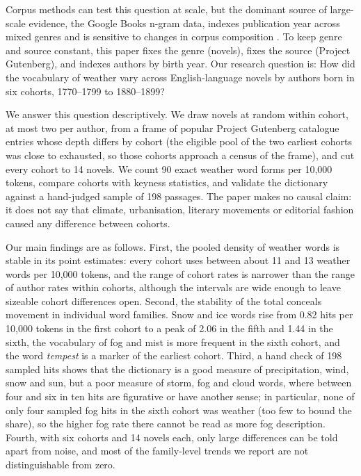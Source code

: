 \documentclass[11pt]{article}
\begin{document}
Corpus methods can test this question at scale, but the dominant source of large-scale evidence, the Google Books n-gram data, indexes publication year across mixed genres and is sensitive to changes in corpus composition \citep{michel2010quantitative, koplenig2015why, koplenig2015the}. To keep genre and source constant, this paper fixes the genre (novels), fixes the source (Project Gutenberg), and indexes authors by birth year. Our research question is: How did the vocabulary of weather vary across English-language novels by authors born in six cohorts, 1770--1799 to 1880--1899?

We answer this question descriptively. We draw novels at random within cohort, at most two per author, from a frame of popular Project Gutenberg catalogue entries whose depth differs by cohort (the eligible pool of the two earliest cohorts was close to exhausted, so those cohorts approach a census of the frame), and cut every cohort to 14 novels. We count 90 exact weather word forms per 10,000 tokens, compare cohorts with keyness statistics, and validate the dictionary against a hand-judged sample of 198 passages. The paper makes no causal claim: it does not say that climate, urbanisation, literary movements or editorial fashion caused any difference between cohorts.

Our main findings are as follows. First, the pooled density of weather words is stable in its point estimates: every cohort uses between about 11 and 13 weather words per 10,000 tokens, and the range of cohort rates is narrower than the range of author rates within cohorts, although the intervals are wide enough to leave sizeable cohort differences open. Second, the stability of the total conceals movement in individual word families. Snow and ice words rise from 0.82 hits per 10,000 tokens in the first cohort to a peak of 2.06 in the fifth and 1.44 in the sixth, the vocabulary of fog and mist is more frequent in the sixth cohort, and the word \emph{tempest} is a marker of the earliest cohort. Third, a hand check of 198 sampled hits shows that the dictionary is a good measure of precipitation, wind, snow and sun, but a poor measure of storm, fog and cloud words, where between four and six in ten hits are figurative or have another sense; in particular, none of only four sampled fog hits in the sixth cohort was weather (too few to bound the share), so the higher fog rate there cannot be read as more fog description. Fourth, with six cohorts and 14 novels each, only large differences can be told apart from noise, and most of the family-level trends we report are not distinguishable from zero.
\end{document}
